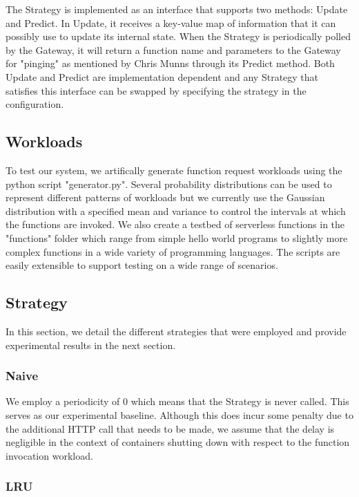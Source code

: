 \documentclass{article}
\begin{document}
The Strategy is implemented as an interface that supports two methods: Update and Predict. In Update, it receives a key-value map of information that it can possibly use to update its internal state. When the Strategy is periodically polled by the Gateway, it will return a function name and parameters to the Gateway for "pinging" as mentioned by Chris Munns through its Predict method. Both Update and Predict are implementation dependent and any Strategy that satisfies this interface can be swapped by specifying the strategy in the configuration.

\subsection{Workloads}

To test our system, we artifically generate function request workloads using the python script "generator.py". Several probability distributions can be used to represent different patterns of workloads but we currently use the Gaussian distribution with a specified mean and variance to control the intervals at which the functions are invoked. We also create a testbed of serverless functions in the "functions" folder which range from simple hello world programs to slightly more complex functions in a wide variety of programming languages. The scripts are easily extensible to support testing on a wide range of scenarios.

\subsection{Strategy}

In this section, we detail the different strategies that were employed and provide experimental results in the next section.

\subsubsection{Naive}

We employ a periodicity of 0 which means that the Strategy is never called. This serves as our experimental baseline. Although this does incur some penalty due to the additional HTTP call that needs to be made, we assume that the delay is negligible in the context of containers shutting down with respect to the function invocation workload.

\subsubsection{LRU}
\end{document}

